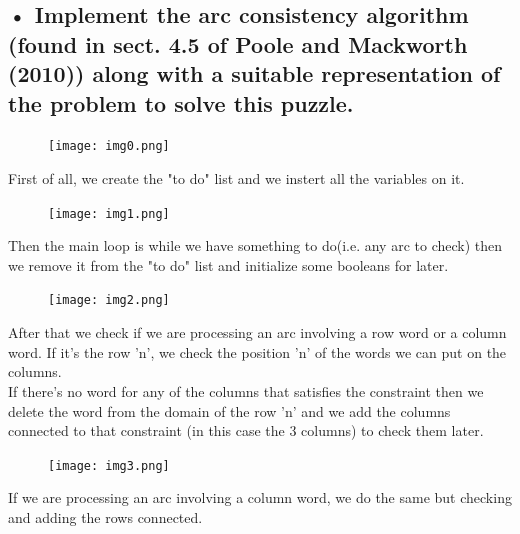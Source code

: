 \documentclass[paper=a4, fontsize=11pt]{scrartcl} %
\numberwithin{equation}{section} %
\numberwithin{figure}{section} %
\numberwithin{table}{section} %
\begin{document}
\begin{itemize}
  

 

 \end{itemize}



\subsection*{• Implement the arc consistency algorithm (found in sect. 4.5 of Poole and Mackworth (2010)) along with a suitable representation of the problem to solve this puzzle.}

\begin{figure}[H]
	\texttt{[image: img0.png]}
\end{figure}

First of all, we create the "to do" list and we instert all the variables on it.

\begin{figure}[H]
	\texttt{[image: img1.png]}
\end{figure} 

Then the main loop is while we have something to do(i.e. any arc to check) then we remove it from the "to do" list and initialize some booleans for later.

\begin{figure}[H]
	\texttt{[image: img2.png]}
\end{figure}

After that we check if we are processing an arc involving a row word or a column word. If it's the row 'n', we check the position 'n' of the words we can put on the columns.\\

If there's no word for any of the columns that satisfies the constraint then we delete the word from the domain of the row 'n' and we add the columns connected to that constraint (in this case the 3 columns) to check them later.

\begin{figure}[H]
	\texttt{[image: img3.png]}
\end{figure}

If we are processing an arc involving a column word, we do the same but checking and adding the rows connected.



\end{document}
